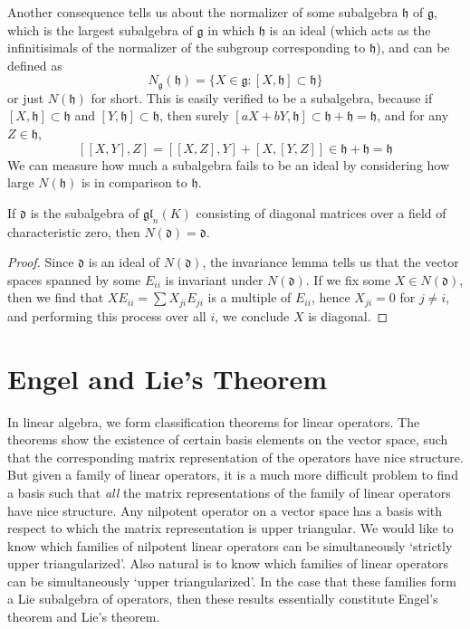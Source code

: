 Another consequence tells us about the normalizer of some subalgebra $\mathfrak{h}$ of $\mathfrak{g}$, which is the largest subalgebra of $\mathfrak{g}$ in which $\mathfrak{h}$ is an ideal (which acts as the infinitisimals of the normalizer of the subgroup corresponding to $\mathfrak{h}$), and can be defined as
%
\[ N_\mathfrak{g}(\mathfrak{h}) = \{ X \in \mathfrak{g}: [X,\mathfrak{h}] \subset \mathfrak{h} \} \]
%
or just $N(\mathfrak{h})$ for short. This is easily verified to be a subalgebra, because if $[X,\mathfrak{h}] \subset \mathfrak{h}$ and $[Y, \mathfrak{h}] \subset \mathfrak{h}$, then surely $[aX + bY, \mathfrak{h}] \subset \mathfrak{h} + \mathfrak{h} = \mathfrak{h}$, and for any $Z \in \mathfrak{h}$,
%
\[ [[X,Y], Z] = [[X,Z],Y] + [X,[Y,Z]] \in \mathfrak{h} + \mathfrak{h} = \mathfrak{h} \]
%
We can measure how much a subalgebra fails to be an ideal by considering how large $N(\mathfrak{h})$ is in comparison to $\mathfrak{h}$.

\begin{theorem}
    If $\mathfrak{d}$ is the subalgebra of $\mathfrak{gl}_n(K)$ consisting of diagonal matrices over a field of characteristic zero, then $N(\mathfrak{d}) = \mathfrak{d}$.
\end{theorem}
\begin{proof}
    Since $\mathfrak{d}$ is an ideal of $N(\mathfrak{d})$, the invariance lemma tells us that the vector spaces spanned by some $E_{ii}$ is invariant under $N(\mathfrak{d})$. If we fix some $X \in N(\mathfrak{d})$, then we find that $XE_{ii} = \sum X_{ji} E_{ji}$ is a multiple of $E_{ii}$, hence $X_{ji} = 0$ for $j \neq i$, and performing this process over all $i$, we conclude $X$ is diagonal.
\end{proof}

\section{Engel and Lie's Theorem}

In linear algebra, we form classification theorems for linear operators. The theorems show the existence of certain basis elements on the vector space, such that the corresponding matrix representation of the operators have nice structure. But given a family of linear operators, it is a much more difficult problem to find a basis such that {\it all} the matrix representations of the family of linear operators have nice structure. Any nilpotent operator on a vector space has a basis with respect to which the matrix representation is upper triangular. We would like to know which families of nilpotent linear operators can be simultaneously `strictly upper triangularized'. Also natural is to know which families of linear operators can be simultaneously `upper triangularized'. In the case that these families form a Lie subalgebra of operators, then these results essentially constitute Engel's theorem and Lie's theorem.

